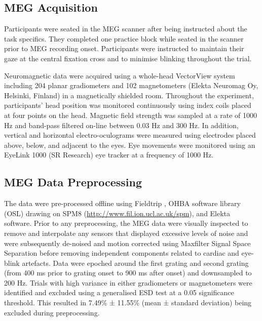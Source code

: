 \documentclass{article}
\begin{document}
\begin{normalsize}
\subsection{MEG Acquisition}
Participants were seated in the MEG scanner after being instructed about the task specifics. They completed one practice block while seated in the scanner prior to MEG recording onset. Participants were instructed to maintain their gaze at the central fixation cross and to minimise blinking throughout the trial. 

Neuromagnetic data were acquired using a whole-head VectorView system including 204 planar gradiometers and 102 magnetometers (Elekta Neuromag Oy, Helsinki, Finland) in a magnetically shielded room. Throughout the experiment, participants’ head position was monitored continuously using index coils placed at four points on the head. Magnetic field strength was sampled at a rate of 1000 Hz and band-pass filtered on-line between 0.03 Hz and 300 Hz. In addition, vertical and horizontal electro-oculograms were measured using electrodes placed above, below, and adjacent to the eyes. Eye movements were monitored using an EyeLink 1000 (SR Research) eye tracker at a frequency of 1000 Hz.\\


\subsection{MEG Data Preprocessing} 
The data were pre-processed offline using Fieldtrip \parencite{Oostenveld2011}, OHBA software library (OSL) drawing on SPM8 (\url{http://www.fil.ion.ucl.ac.uk/spm}), and Elekta software. Prior to any preprocessing, the MEG data were visually inspected to remove and interpolate any sensors that displayed excessive levels of noise and were subsequently de-noised and motion corrected using Maxfilter Signal Space Separation \parencite{Taulu2004} before removing independent components related to cardiac and eye-blink artefacts. Data were epoched around the first grating and second grating (from 400 ms prior to grating onset to 900 ms after onset) and downsampled to 200 Hz. Trials with high variance in either gradiometers or magnetometers were identified and excluded using a generalised ESD \parencite[extreme studentised deviate;][]{Rosner1983} test at a 0.05 significance threshold. This resulted in 7.49\% ± 11.55\% (mean ± standard deviation) being excluded during preprocessing.  \\


\end{normalsize}
\end{document}
